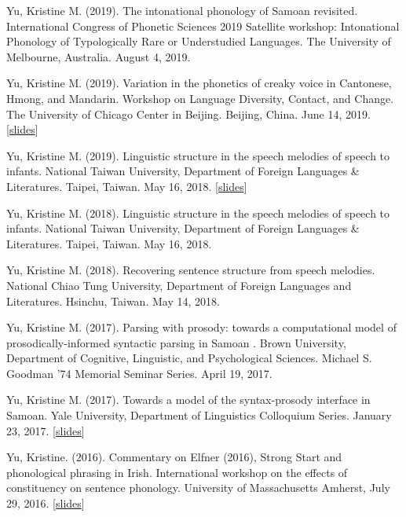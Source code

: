 \documentclass[10pt]{article}
\begin{document}
\begin{bibenum}

\item Yu, Kristine M. (2019). The intonational phonology of Samoan revisited. International Congress of Phonetic Sciences 2019 Satellite workshop: Intonational Phonology of Typologically Rare or Understudied Languages. The University of Melbourne, Australia. August 4, 2019. 
  
\item Yu, Kristine M. (2019). Variation in the phonetics of creaky voice in Cantonese, Hmong, and Mandarin. Workshop on Language Diversity, Contact, and Change. The University of Chicago Center in Beijing. Beijing, China. June 14, 2019. [\href{https://speakerdeck.com/krisyu/uchicago-beijing-creak-kmyu-201906}{slides}]

  
\item Yu, Kristine M. (2019). Linguistic structure in the speech melodies of speech to infants. National Taiwan University, Department of Foreign Languages \& Literatures. Taipei, Taiwan. May 16, 2018. [\href{https://speakerdeck.com/krisyu/towards-a-model-of-the-samoan-syntax-prosody-interface}{slides}]

  
\item Yu, Kristine M. (2018). Linguistic structure in the speech melodies of speech to infants. National Taiwan University, Department of Foreign Languages \& Literatures. Taipei, Taiwan. May 16, 2018. 
  
\item Yu, Kristine M. (2018). Recovering sentence structure from speech melodies. National Chiao Tung University, Department of Foreign Languages and Literatures. Hsinchu, Taiwan. May 14, 2018.
  
\item Yu, Kristine M. (2017). Parsing with prosody: towards a computational model of prosodically-informed syntactic parsing in Samoan
. Brown University, Department of
  Cognitive, Linguistic, and Psychological Sciences. Michael S. Goodman '74 Memorial Seminar Series. April 19, 2017.  
\item Yu, Kristine M. (2017). Towards a model of the syntax-prosody interface in Samoan. Yale University, Department of
  Linguistics Colloquium Series. January 23, 2017. [\href{https://speakerdeck.com/krisyu/towards-a-model-of-the-samoan-syntax-prosody-interface}{slides}]
  \item Yu, Kristine. (2016). Commentary on Elfner (2016), Strong
    Start and phonological phrasing in Irish. International workshop on the effects of
    constituency on sentence phonology. University of Massachusetts
    Amherst, July 29, 2016. [\href{https://speakerdeck.com/krisyu/commentary-on-elfners-strong-start-and-phonological-phrasing-in-irish}{slides}]


\end{bibenum}
\end{document}
